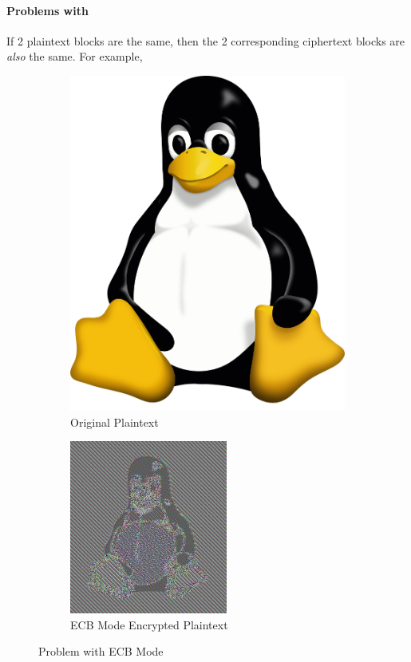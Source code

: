 \paragraph{Problems with }\label{par:Problems_Electronic_Codebook_Mode}
If 2 plaintext blocks are the same, then the 2 corresponding ciphertext blocks are \emph{also} the same.
For example,
\begin{figure}[ht!]
  \centering
  \begin{subfigure}[h!]{0.45\linewidth}
    \centering
    \includegraphics[scale=0.50]{./Drawings/EDIN01-Cryptography/Tux.png}
    \caption{Original Plaintext}
    \label{subfig:ECB_Mode_Plaintext_Input}
  \end{subfigure}
  \begin{subfigure}[h!]{0.45\linewidth}
    \centering
    \includegraphics[scale=0.55]{./Drawings/EDIN01-Cryptography/Tux_ECB.jpg}
    \caption{ECB Mode Encrypted Plaintext}
    \label{subfig:ECB_Mode_Encrypted_Plaintext}
  \end{subfigure}
  \caption{Problem with ECB Mode}
  \label{fig:Problem_Electronic_Codebook_Mode}
\end{figure}

